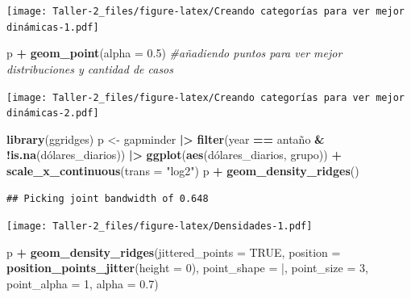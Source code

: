 \documentclass[
]{article}
\newenvironment{Shaded}{\begin{snugshade}}{\end{snugshade}}
\newcommand{\AttributeTok}[1]{\textcolor[rgb]{0.13,0.29,0.53}{#1}}
\newcommand{\CommentTok}[1]{\textcolor[rgb]{0.56,0.35,0.01}{\textit{#1}}}
\newcommand{\ConstantTok}[1]{\textcolor[rgb]{0.56,0.35,0.01}{#1}}
\newcommand{\DecValTok}[1]{\textcolor[rgb]{0.00,0.00,0.81}{#1}}
\newcommand{\FloatTok}[1]{\textcolor[rgb]{0.00,0.00,0.81}{#1}}
\newcommand{\FunctionTok}[1]{\textcolor[rgb]{0.13,0.29,0.53}{\textbf{#1}}}
\newcommand{\NormalTok}[1]{#1}
\newcommand{\OtherTok}[1]{\textcolor[rgb]{0.56,0.35,0.01}{#1}}
\newcommand{\SpecialCharTok}[1]{\textcolor[rgb]{0.81,0.36,0.00}{\textbf{#1}}}
\newcommand{\StringTok}[1]{\textcolor[rgb]{0.31,0.60,0.02}{#1}}
\begin{document}
\texttt{[image: Taller-2\_files/figure-latex/Creando categorías para ver mejor dinámicas-1.pdf]}

\begin{Shaded}
\begin{Highlighting}[]
\NormalTok{p }\SpecialCharTok{+} \FunctionTok{geom\_point}\NormalTok{(}\AttributeTok{alpha =} \FloatTok{0.5}\NormalTok{) }\CommentTok{\#añadiendo puntos para ver mejor distribuciones y cantidad de casos}
\end{Highlighting}
\end{Shaded}

\texttt{[image: Taller-2\_files/figure-latex/Creando categorías para ver mejor dinámicas-2.pdf]}

\begin{Shaded}
\begin{Highlighting}[]
\FunctionTok{library}\NormalTok{(ggridges)}
\NormalTok{p }\OtherTok{\textless{}{-}}\NormalTok{ gapminder }\SpecialCharTok{|\textgreater{}}
  \FunctionTok{filter}\NormalTok{(year }\SpecialCharTok{==}\NormalTok{ antaño }\SpecialCharTok{\&} \SpecialCharTok{!}\FunctionTok{is.na}\NormalTok{(dólares\_diarios)) }\SpecialCharTok{|\textgreater{}}
  \FunctionTok{ggplot}\NormalTok{(}\FunctionTok{aes}\NormalTok{(dólares\_diarios, grupo)) }\SpecialCharTok{+}
  \FunctionTok{scale\_x\_continuous}\NormalTok{(}\AttributeTok{trans =} \StringTok{"log2"}\NormalTok{)}
\NormalTok{p }\SpecialCharTok{+} \FunctionTok{geom\_density\_ridges}\NormalTok{()}
\end{Highlighting}
\end{Shaded}

\begin{verbatim}
## Picking joint bandwidth of 0.648
\end{verbatim}

\texttt{[image: Taller-2\_files/figure-latex/Densidades-1.pdf]}

\begin{Shaded}
\begin{Highlighting}[]
\NormalTok{p }\SpecialCharTok{+} \FunctionTok{geom\_density\_ridges}\NormalTok{(}\AttributeTok{jittered\_points =} \ConstantTok{TRUE}\NormalTok{,}
                        \AttributeTok{position =} \FunctionTok{position\_points\_jitter}\NormalTok{(}\AttributeTok{height =} \DecValTok{0}\NormalTok{),}
                        \AttributeTok{point\_shape =} \StringTok{\textquotesingle{}|\textquotesingle{}}\NormalTok{, }\AttributeTok{point\_size =} \DecValTok{3}\NormalTok{,}
                        \AttributeTok{point\_alpha =} \DecValTok{1}\NormalTok{, }\AttributeTok{alpha =} \FloatTok{0.7}\NormalTok{) }
\end{Highlighting}
\end{Shaded}
\end{document}
